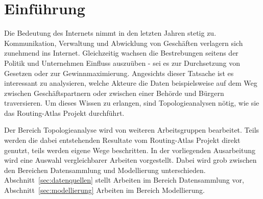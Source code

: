 \newpage

\section{Einführung}

Die Bedeutung des Internets nimmt in den letzten Jahren stetig zu.
Kommunikation, Verwaltung und Abwicklung von Geschäften verlagern sich zunehmend ins Internet.
Gleichzeitig wachsen die Bestrebungen seitens der Politik und Unternehmen Einfluss auszuüben - sei es zur Durchsetzung von Gesetzen oder zur Gewinnmaximierung.
Angesichts dieser Tatsache ist es interessant zu analysieren, welche Akteure die Daten beispielsweise auf dem Weg zwischen Geschäftspartnern oder zwischen einer Behörde und Bürgern traversieren. %
Um dieses Wissen zu erlangen, sind Topologieanalysen nötig, wie sie das Routing-Atlas Projekt durchführt.

Der Bereich Topologieanalyse wird von weiteren Arbeitsgruppen bearbeitet.
Teils werden die dabei entstehenden Resultate vom Routing-Atlas Projekt direkt genutzt, teils werden eigene Wege beschritten.
In der vorliegenden Ausarbeitung wird eine Auswahl vergleichbarer Arbeiten vorgestellt.
Dabei wird grob zwischen den Bereichen Datensammlung und Modellierung unterschieden.
Abschnitt~\ref{sec:datenquellen} stellt Arbeiten im Bereich Datensammlung vor, Abschnitt~\ref{sec:modellierung} Arbeiten im Bereich Modellierung.



